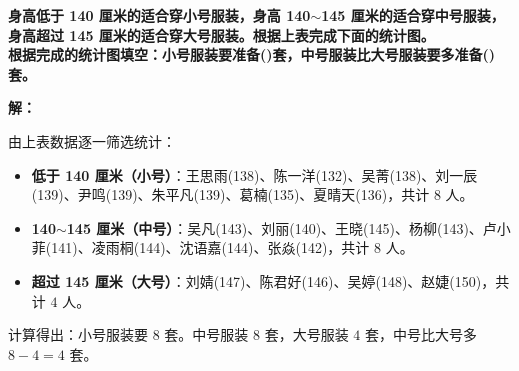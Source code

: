 \documentclass[12pt, a4paper]{ctexrep}
\begin{document}
\textbf{身高低于 140 厘米的适合穿小号服装，身高 140$\sim$145 厘米的适合穿中号服装，身高超过 145 厘米的适合穿大号服装。根据上表完成下面的统计图。}\\
\textbf{根据完成的统计图填空：小号服装要准备(\qquad)套，中号服装比大号服装要多准备(\qquad)套。}

\vspace{0.8cm}
\textbf{解：}

由上表数据逐一筛选统计：
\begin{itemize}
    \item \textbf{低于 140 厘米（小号）}：王思雨(138)、陈一洋(132)、吴菁(138)、刘一辰(139)、尹鸣(139)、朱平凡(139)、葛楠(135)、夏晴天(136)，共计 $8$ 人。
    \item \textbf{140$\sim$145 厘米（中号）}：吴凡(143)、刘丽(140)、王晓(145)、杨柳(143)、卢小菲(141)、凌雨桐(144)、沈语嘉(144)、张焱(142)，共计 $8$ 人。
    \item \textbf{超过 145 厘米（大号）}：刘婧(147)、陈君好(146)、吴婷(148)、赵婕(150)，共计 $4$ 人。
\end{itemize}

计算得出：小号服装要 $8$ 套。中号服装 $8$ 套，大号服装 $4$ 套，中号比大号多 $8 - 4 = 4$ 套。
\end{document}
